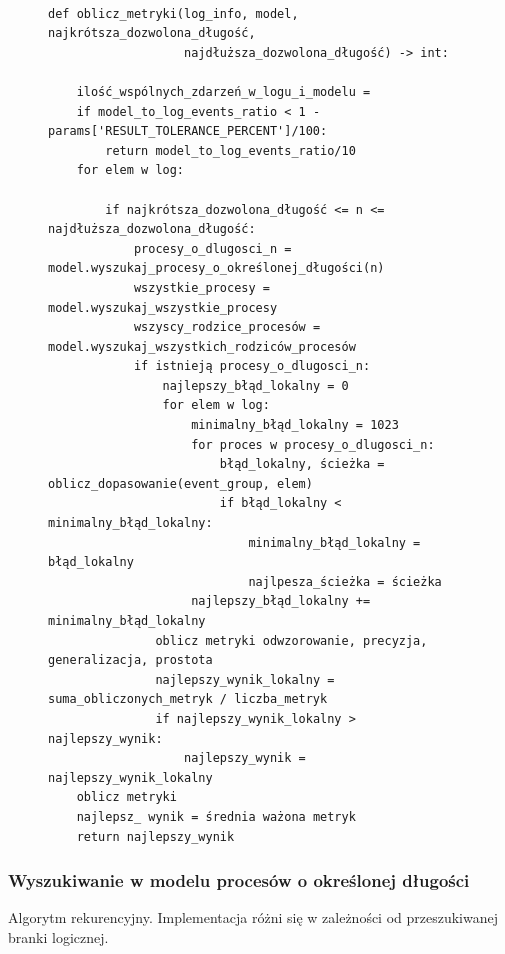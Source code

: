\begin{figure}[!ht]
\lstset{caption=Obliczanie metryk, captionpos=b}
\lstset{label=src:best_result, frame=single}
\begin{lstlisting}

def oblicz_metryki(log_info, model, najkrótsza_dozwolona_długość, 
				   najdłuższa_dozwolona_długość) -> int:
	
	ilość_wspólnych_zdarzeń_w_logu_i_modelu = 			   
	if model_to_log_events_ratio < 1 - params['RESULT_TOLERANCE_PERCENT']/100:
        return model_to_log_events_ratio/10
	for elem w log:
		
        if najkrótsza_dozwolona_długość <= n <= najdłuższa_dozwolona_długość:
            procesy_o_dlugosci_n = model.wyszukaj_procesy_o_określonej_długości(n)
            wszystkie_procesy = model.wyszukaj_wszystkie_procesy
            wszyscy_rodzice_procesów = model.wyszukaj_wszystkich_rodziców_procesów
            if istnieją procesy_o_dlugosci_n:
                najlepszy_błąd_lokalny = 0
                for elem w log:
                    minimalny_błąd_lokalny = 1023
                    for proces w procesy_o_dlugosci_n:
                        błąd_lokalny, ścieżka = oblicz_dopasowanie(event_group, elem)
                        if błąd_lokalny < minimalny_błąd_lokalny:
                            minimalny_błąd_lokalny = błąd_lokalny
                            najlpesza_ścieżka = ścieżka
                    najlepszy_błąd_lokalny += minimalny_błąd_lokalny
               oblicz metryki odwzorowanie, precyzja, generalizacja, prostota 
               najlepszy_wynik_lokalny = suma_obliczonych_metryk / liczba_metryk
               if najlepszy_wynik_lokalny > najlepszy_wynik:
                   najlepszy_wynik = najlepszy_wynik_lokalny
	oblicz metryki 
	najlepsz_ wynik = średnia ważona metryk
    return najlepszy_wynik
\end{lstlisting}
\end{figure}

\subsubsection{Wyszukiwanie w modelu procesów o określonej długości}

Algorytm rekurencyjny. Implementacja różni się w zależności od przeszukiwanej branki logicznej.
\begin{figure}[!ht]
\lstset{caption=Wyszukiwanie procesów o długości n, captionpos=b}
\lstset{label=src:get_n_length, frame=single}
\begin{lstlisting}
\end{lstlisting}
\end{figure}

